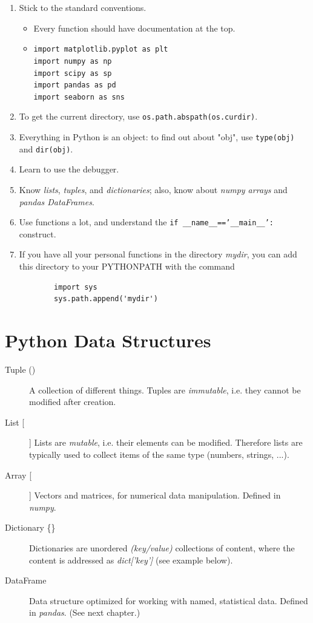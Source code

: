 \begin{enumerate}
  \item Stick to the standard conventions.
      \begin{itemize}
        \item Every function should have documentation at the top.
        \item \texttt{import matplotlib.pyplot as plt}\\
            \texttt{import numpy as np}\\
            \texttt{import scipy as sp}\\
            \texttt{import pandas as pd}\\
            \texttt{import seaborn as sns}
      \end{itemize}
  \item To get the current directory, use \texttt{os.path.abspath(os.curdir)}.
  \item Everything in Python is an object: to find out about "obj", use \texttt{type(obj)} and \texttt{dir(obj)}.
  \item Learn to use the debugger.
  \item Know \emph{lists}, \emph{tuples}, and \emph{dictionaries}; also, know about \emph{numpy arrays} and \emph{pandas DataFrames}.
  \item Use functions a lot, and understand the \texttt{if \_\_name\_\_=='\_\_main\_\_':} construct.
  \item If you have all your personal functions in the directory \emph{mydir}, you can add this directory to your PYTHONPATH with the command
      \begin{lstlisting}
        import sys
        sys.path.append('mydir')
      \end{lstlisting}
\end{enumerate}

\section{Python Data Structures}

\begin{description}
  \item[Tuple ()] A collection of different things. Tuples are \emph{immutable}, i.e. they cannot be modified after creation.
  \item[List [] ] Lists are \emph{mutable}, i.e. their elements can be modified. Therefore lists are typically used to collect items of the same type (numbers, strings, ...).
  \item[Array [] ] Vectors and matrices, for numerical data manipulation. Defined in \emph{numpy}.
  \item[Dictionary \{\}] Dictionaries are unordered \emph{(key/value)} collections of content, where the content is addressed as \emph{dict['key']} (see example below).
  \item[DataFrame] Data structure optimized for working with named, statistical data. Defined in \emph{pandas}. (See next chapter.)
\end{description}

